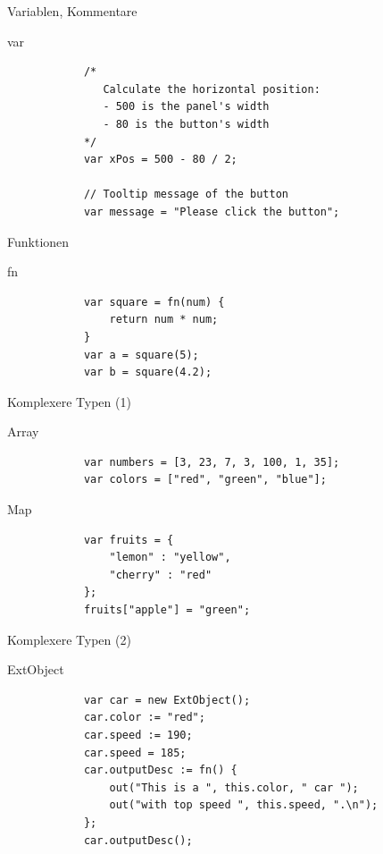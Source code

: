 \documentclass[ucs,9pt]{beamer}
\begin{document}
\begin{frame}[fragile]{Variablen, Kommentare}
	\begin{block}{var}
		\begin{lstlisting}
			/*
			   Calculate the horizontal position:
			   - 500 is the panel's width
			   - 80 is the button's width
			*/
			var xPos = 500 - 80 / 2;

			// Tooltip message of the button
			var message = "Please click the button";
		\end{lstlisting}
	\end{block}
\end{frame}

\begin{frame}[fragile]{Funktionen}
	\begin{block}{fn}
		\begin{lstlisting}
			var square = fn(num) {
			    return num * num;
			}
			var a = square(5);
			var b = square(4.2);
		\end{lstlisting}
	\end{block}
\end{frame}

\begin{frame}[fragile]{Komplexere Typen (1)}
	\begin{block}{Array}
		\begin{lstlisting}
			var numbers = [3, 23, 7, 3, 100, 1, 35];
			var colors = ["red", "green", "blue"];
		\end{lstlisting}
	\end{block}
	\begin{block}{Map}
		\begin{lstlisting}
			var fruits = {
			    "lemon" : "yellow",
			    "cherry" : "red"
			};
			fruits["apple"] = "green";
		\end{lstlisting}
	\end{block}
\end{frame}

\begin{frame}[fragile]{Komplexere Typen (2)}
	\begin{block}{ExtObject}
		\begin{lstlisting}
			var car = new ExtObject();
			car.color := "red";
			car.speed := 190;
			car.speed = 185;
			car.outputDesc := fn() {
			    out("This is a ", this.color, " car ");
			    out("with top speed ", this.speed, ".\n");
			};
			car.outputDesc();
		\end{lstlisting}
	\end{block}
\end{frame}
 
\end{document}
